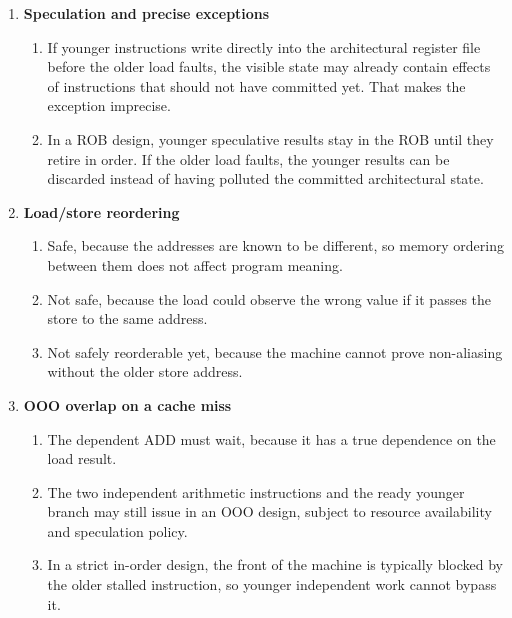 \documentclass[11pt]{article}
\begin{document}
\begin{enumerate}[label=\textbf{B\arabic*.}]
  \item \textbf{Speculation and precise exceptions}
  \begin{enumerate}[label=(\alph*)]
    \item If younger instructions write directly into the architectural register file before the older load faults, the visible state may already contain effects of instructions that should not have committed yet. That makes the exception imprecise.
    \item In a ROB design, younger speculative results stay in the ROB until they retire in order. If the older load faults, the younger results can be discarded instead of having polluted the committed architectural state.
  \end{enumerate}

  \item \textbf{Load/store reordering}
  \begin{enumerate}[label=(\alph*)]
    \item Safe, because the addresses are known to be different, so memory ordering between them does not affect program meaning.
    \item Not safe, because the load could observe the wrong value if it passes the store to the same address.
    \item Not safely reorderable yet, because the machine cannot prove non-aliasing without the older store address.
  \end{enumerate}

  \item \textbf{OOO overlap on a cache miss}
  \begin{enumerate}[label=(\alph*)]
    \item The dependent ADD must wait, because it has a true dependence on the load result.
    \item The two independent arithmetic instructions and the ready younger branch may still issue in an OOO design, subject to resource availability and speculation policy.
    \item In a strict in-order design, the front of the machine is typically blocked by the older stalled instruction, so younger independent work cannot bypass it.
  \end{enumerate}
\end{enumerate}
\end{document}
